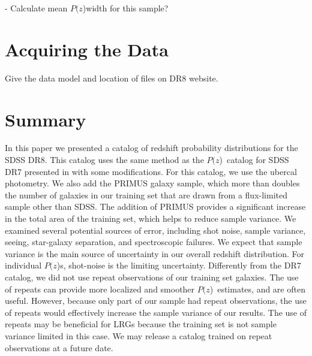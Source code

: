 \documentclass[preprint]{aastex}
\newcommand{\pofz}{$P(z$)}
\begin{document}
 - Calculate mean \pofz width for this sample?


\section{Acquiring the Data}

{\color{red} Give the data model and location  of files on DR8 website. }

\section{Summary}

In this paper we presented a catalog of redshift probability distributions for
the SDSS DR8.  This catalog uses the same method as the \pofz\ catalog for SDSS
DR7 presented in \cite{CunhaPhotoz09} with some modifications.  For this
catalog, we use the ubercal photometry.  We also add the PRIMUS galaxy sample,
which more than doubles the number of galaxies in our training set that are
drawn from a flux-limited sample other than SDSS.  The addition of PRIMUS
provides a significant increase in the total area of the training set, which
helps to reduce sample variance.  We examined several potential sources of
error, including shot noise, sample variance, seeing, star-galaxy separation,
and spectroscopic failures.  We expect that sample variance is the main source
of uncertainty in our overall redshift distribution.  For individual \pofz s,
shot-noise is the limiting uncertainty.  Differently from the DR7 catalog, we
did not use repeat observations of our training set galaxies.  The use of
repeats can provide more localized and smoother \pofz\ estimates, and are often
useful.  However, because only part of our sample had repeat observations, the
use of repeats would effectively increase the sample variance of our results.
The use of repeats may be beneficial for LRGs because the training set is not
sample variance limited in this case.  We may release a catalog trained on
repeat observations at a future date.  

\newpage











\end{document}
